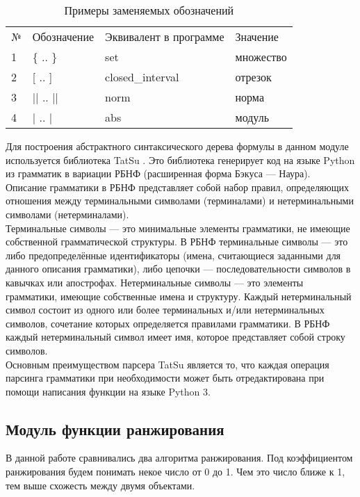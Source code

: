 \documentclass[12pt]{article}
\begin{document}
\begin{table}[h!]
\begin{tabular}{ l l l l}
№ & Обозначение & Эквивалент в программе & Значение  \\
1 & \{ .. \} & set  & множество\\
2 & [ .. ] & closed\_interval  & отрезок \\
3 & || .. || & norm & норма \\
4 & | .. | & abs & модуль \\

\end{tabular}
\label{table:satellites}
  \caption{Примеры заменяемых обозначений}
\end{table} 

Для построения абстрактного синтаксического дерева формулы в данном модуле используется библиотека TatSu . Это библиотека генерирует код на языке Python из грамматик в вариации РБНФ (расширенная форма Бэкуса — Наура).\\

Описание грамматики в РБНФ представляет собой набор правил, определяющих отношения между терминальными символами (терминалами) и нетерминальными символами (нетерминалами).\\

    Терминальные символы — это минимальные элементы грамматики, не имеющие собственной грамматической структуры. В РБНФ терминальные символы — это либо предопределённые идентификаторы (имена, считающиеся заданными для данного описания грамматики), либо цепочки — последовательности символов в кавычках или апострофах. Нетерминальные символы — это элементы грамматики, имеющие собственные имена и структуру. Каждый нетерминальный символ состоит из одного или более терминальных и/или нетерминальных символов, сочетание которых определяется правилами грамматики. В РБНФ каждый нетерминальный символ имеет имя, которое представляет собой строку символов.\\

Основным преимуществом парсера TatSu является то, что каждая операция парсинга грамматики при необходимости может быть отредактирована при помощи написания функции на языке Python 3.

\newpage
\subsection{Модуль функции ранжирования}
В данной работе сравнивались два алгоритма ранжирования. Под коэффициентом ранжирования будем понимать некое число от 0 до 1. Чем это число ближе к 1, тем выше схожесть между двумя объектами.\\
\end{document}
